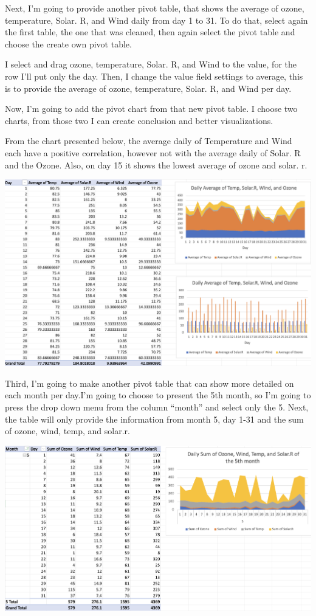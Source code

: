 \documentclass[
  letterpaper,
  DIV=11,
  numbers=noendperiod]{scrreprt}
\begin{document}
Next, I'm going to provide another pivot table, that shows the average
of ozone, temperature, Solar. R, and Wind daily from day 1 to 31. To do
that, select again the first table, the one that was cleaned, then again
select the pivot table and choose the create own pivot table.

I select and drag ozone, temperature, Solar. R, and Wind to the value,
for the row I'll put only the day. Then, I change the value field
settings to average, this is to provide the average of ozone,
temperature, Solar. R, and Wind per day.

Now, I'm going to add the pivot chart from that new pivot table. I
choose two charts, from those two I can create conclusion and better
visualizations.

From the chart presented below, the average daily of Temperature and
Wind each have a positive correlation, however not with the average
daily of Solar. R and the Ozone. Also, on day 15 it shows the lowest
average of ozone and solar. r.

\includegraphics{./pivot2.png}

Third, I'm going to make another pivot table that can show more detailed
on each month per day.I'm going to choose to present the 5th month, so
I'm going to press the drop down menu from the column ``month'' and
select only the 5. Next, the table will only provide the information
from month 5, day 1-31 and the sum of ozone, wind, temp, and solar.r.

\includegraphics{./pivot3.png}
\end{document}

